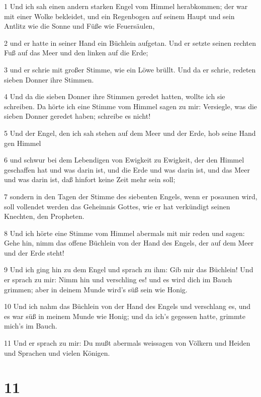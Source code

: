 \par 1 Und ich sah einen andern starken Engel vom Himmel herabkommen; der war mit einer Wolke bekleidet, und ein Regenbogen auf seinem Haupt und sein Antlitz wie die Sonne und Füße wie Feuersäulen,
\par 2 und er hatte in seiner Hand ein Büchlein aufgetan. Und er setzte seinen rechten Fuß auf das Meer und den linken auf die Erde;
\par 3 und er schrie mit großer Stimme, wie ein Löwe brüllt. Und da er schrie, redeten sieben Donner ihre Stimmen.
\par 4 Und da die sieben Donner ihre Stimmen geredet hatten, wollte ich sie schreiben. Da hörte ich eine Stimme vom Himmel sagen zu mir: Versiegle, was die sieben Donner geredet haben; schreibe es nicht!
\par 5 Und der Engel, den ich sah stehen auf dem Meer und der Erde, hob seine Hand gen Himmel
\par 6 und schwur bei dem Lebendigen von Ewigkeit zu Ewigkeit, der den Himmel geschaffen hat und was darin ist, und die Erde und was darin ist, und das Meer und was darin ist, daß hinfort keine Zeit mehr sein soll;
\par 7 sondern in den Tagen der Stimme des siebenten Engels, wenn er posaunen wird, soll vollendet werden das Geheimnis Gottes, wie er hat verkündigt seinen Knechten, den Propheten.
\par 8 Und ich hörte eine Stimme vom Himmel abermals mit mir reden und sagen: Gehe hin, nimm das offene Büchlein von der Hand des Engels, der auf dem Meer und der Erde steht!
\par 9 Und ich ging hin zu dem Engel und sprach zu ihm: Gib mir das Büchlein! Und er sprach zu mir: Nimm hin und verschling es! und es wird dich im Bauch grimmen; aber in deinem Munde wird's süß sein wie Honig.
\par 10 Und ich nahm das Büchlein von der Hand des Engels und verschlang es, und es war süß in meinem Munde wie Honig; und da ich's gegessen hatte, grimmte mich's im Bauch.
\par 11 Und er sprach zu mir: Du mußt abermals weissagen von Völkern und Heiden und Sprachen und vielen Königen.

\chapter{11}

